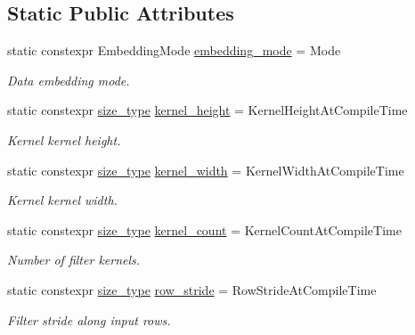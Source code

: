 \subsection*{Static Public Attributes}
\begin{DoxyCompactItemize}
\item 
static constexpr Embedding\-Mode \hyperlink{structffnn_1_1layer_1_1convolution__layer__traits_ab598247847360cd7a710c9b0b14496ae}{embedding\-\_\-mode} = Mode
\begin{DoxyCompactList}\small\item\em Data embedding mode. \end{DoxyCompactList}\item 
static constexpr \hyperlink{namespaceffnn_a63b90a2fd70eb76684eac482a51633e5}{size\-\_\-type} \hyperlink{structffnn_1_1layer_1_1convolution__layer__traits_ad6fb939fee90c196d31a8c98f663caa3}{kernel\-\_\-height} = Kernel\-Height\-At\-Compile\-Time
\begin{DoxyCompactList}\small\item\em Kernel kernel height. \end{DoxyCompactList}\item 
static constexpr \hyperlink{namespaceffnn_a63b90a2fd70eb76684eac482a51633e5}{size\-\_\-type} \hyperlink{structffnn_1_1layer_1_1convolution__layer__traits_a2aafad04475fbeb3b5947ed693859028}{kernel\-\_\-width} = Kernel\-Width\-At\-Compile\-Time
\begin{DoxyCompactList}\small\item\em Kernel kernel width. \end{DoxyCompactList}\item 
static constexpr \hyperlink{namespaceffnn_a63b90a2fd70eb76684eac482a51633e5}{size\-\_\-type} \hyperlink{structffnn_1_1layer_1_1convolution__layer__traits_a4cdb0a6a0f47662f59f77beff2b406e5}{kernel\-\_\-count} = Kernel\-Count\-At\-Compile\-Time
\begin{DoxyCompactList}\small\item\em Number of filter kernels. \end{DoxyCompactList}\item 
static constexpr \hyperlink{namespaceffnn_a63b90a2fd70eb76684eac482a51633e5}{size\-\_\-type} \hyperlink{structffnn_1_1layer_1_1convolution__layer__traits_a6b62abb46818fb4d09b096e53089b4f4}{row\-\_\-stride} = Row\-Stride\-At\-Compile\-Time
\begin{DoxyCompactList}\small\item\em Filter stride along input rows. \end{DoxyCompactList}\item 

\end{DoxyCompactItemize}
